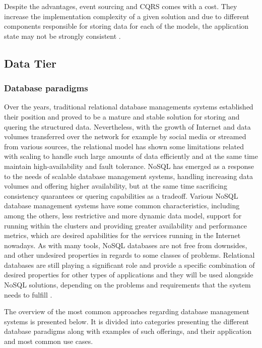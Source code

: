 Despite the advantages, event sourcing and CQRS comes with a cost. They increase the implementation complexity of a given solution and due to different components responsible for storing data for each of the models, the application state may not be strongly consistent \cite{MicroservicesArchitecture}.

\subsection{Data Tier}

\subsubsection{Database paradigms} \label{chapter:database-paradigms}

Over the years, traditional relational database managements systems \cite{RDBMS} established their position and proved to be a mature and stable solution for storing and quering the structured data. Nevertheless, with the growth of Internet and data volumes transferred over the network for example by social media or streamed from various sources, the relational model has shown some limitations related with scaling to handle such large amounts of data efficiently and at the same time maintain high-availability and fault tolerance. NoSQL \cite{FowlerNoSQLDefinition} has emerged as a response to the needs of scalable database management systems, handling increasing data volumes and offering higher availability, but at the same time sacrificing consistency quarantees or quering capabilities as a tradeoff. Various NoSQL database management systems have some common characteristics, including among the others, less restrictive and more dynamic data model, support for running within the clusters and providing greater availability and performance metrics, which are desired apabilities for the services running in the Internet nowadays. As with many tools, NoSQL databases are not free from downsides, and other undesired properties in regards to some classes of problems. Relational databases are still playing a significant role and provide a specific combination of desired properties for other types of applications and they will be used alongside NoSQL solutions, depending on the problems and requirements that the system needs to fulfill \cite{FowlerNoSQLGOTO}.

The overview of the most common approaches regarding database management systems is presented below. It is divided into categories presenting the different database paradigms along with examples of such offerings, and their application and most common use cases.

